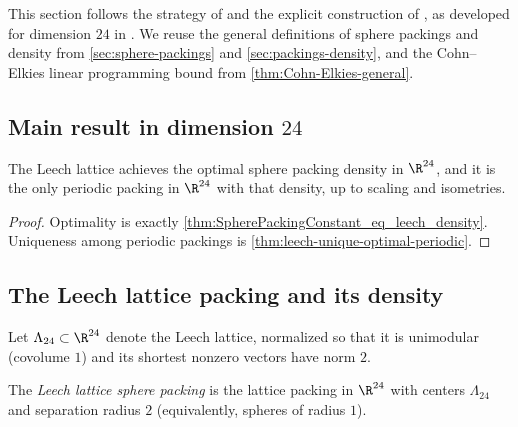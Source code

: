 This section follows the strategy of \cite{ElkiesCohn} and the explicit construction of \cite{Via2017}, as developed for dimension $24$ in \cite{CKMRV24}.
We reuse the general definitions of sphere packings and density from \cref{sec:sphere-packings} and \cref{sec:packings-density}, and the Cohn--Elkies linear programming bound from \cref{thm:Cohn-Elkies-general}.

\subsection{Main result in dimension $24$}

\begin{theorem}\label{thm:MainTheorem-d24}\leanok
  The Leech lattice achieves the optimal sphere packing density in $\R^{24}$, and it is the only periodic packing in $\R^{24}$ with that density, up to scaling and isometries.
\end{theorem}
\begin{proof}\leanok
  Optimality is exactly \cref{thm:SpherePackingConstant_eq_leech_density}.
  Uniqueness among periodic packings is \cref{thm:leech-unique-optimal-periodic}.
\end{proof}

\subsection{The Leech lattice packing and its density}

\begin{definition}\label{def:leech-lattice}\leanok
  Let $\Lambda_{24} \subset \R^{24}$ denote the Leech lattice, normalized so that it is unimodular (covolume $1$) and its shortest nonzero vectors have norm $2$.
\end{definition}

\begin{definition}\label{def:LeechPacking}\leanok
  The \emph{Leech lattice sphere packing} is the lattice packing in $\R^{24}$ with centers $\Lambda_{24}$ and separation radius $2$ (equivalently, spheres of radius $1$).
\end{definition}

